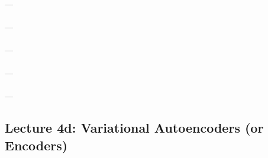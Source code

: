 \documentclass[12pt]{article}
\begin{document}
        \paragraph{\sf} --- 
        \paragraph{\sf} --- 
        \paragraph{\sf} --- 
        \paragraph{\sf} --- 
        \paragraph{\sf} --- 

    \newpage


    \subsection*{Lecture 4d: Variational Autoencoders (or Encoders)} %
\end{document}
